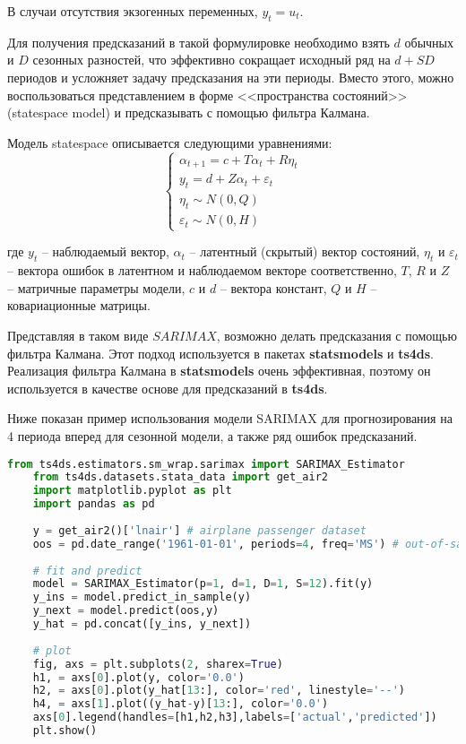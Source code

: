 \documentclass[a4paper,14pt]{extreport}
\begin{document}
	В случаи отсутствия экзогенных переменных, $y_t = u_t$.
	
	Для получения предсказаний в такой формулировке необходимо взять $d$ обычных и $D$ сезонных разностей, что эффективно сокращает исходный ряд на $d+SD$ периодов и усложняет задачу предсказания на эти периоды. Вместо этого, можно воспользоваться представлением в форме <<пространства состояний>> (statespace model) и предсказывать с помощью фильтра Калмана.
	
	Модель statespace описывается следующими уравнениями:
	\begin{equation}
	\begin{cases}
	\alpha_{t+1} = c + T \alpha_t + R \eta_t \\
	y_t = d + Z \alpha_t + \varepsilon_t \\
	\eta_{t} \sim N(0, Q) \\
	\varepsilon_t \sim N(0, H)
	\end{cases} 
	\end{equation}
	
	где $y_t$ – наблюдаемый вектор, $\alpha_t$ – латентный (скрытый) вектор состояний, $\eta_t$ и $\varepsilon_t$ – вектора ошибок в латентном и наблюдаемом векторе соответственно,
	$T$, $R$ и $Z$ – матричные параметры модели, $c$ и $d$ – вектора констант, $Q$ и $H$ – ковариационные матрицы.
	
	Представляя в таком виде $SARIMAX$, возможно делать предсказания с помощью фильтра Калмана. Этот подход используется в пакетах \textbf{statsmodels}\cite{fulton_statespace} и \textbf{ts4ds}. Реализация фильтра Калмана в \textbf{statsmodels} очень эффективная, поэтому он используется в качестве основе для предсказаний в \textbf{ts4ds}. 
	
	Ниже показан пример использования модели SARIMAX для прогнозирования на 4 периода вперед для сезонной модели, а также ряд ошибок предсказаний.
	
	\begin{lstlisting}[language=Python]
	from ts4ds.estimators.sm_wrap.sarimax import SARIMAX_Estimator
	from ts4ds.datasets.stata_data import get_air2
	import matplotlib.pyplot as plt
	import pandas as pd
	
	y = get_air2()['lnair'] # airplane passenger dataset
	oos = pd.date_range('1961-01-01', periods=4, freq='MS') # out-of-sample
	
	# fit and predict
	model = SARIMAX_Estimator(p=1, d=1, D=1, S=12).fit(y)
	y_ins = model.predict_in_sample(y)
	y_next = model.predict(oos,y)
	y_hat = pd.concat([y_ins, y_next])
	
	# plot
	fig, axs = plt.subplots(2, sharex=True)
	h1, = axs[0].plot(y, color='0.0')
	h2, = axs[0].plot(y_hat[13:], color='red', linestyle='--')
	h4, = axs[1].plot((y_hat-y)[13:], color='0.0')
	axs[0].legend(handles=[h1,h2,h3],labels=['actual','predicted'])
	plt.show()
	\end{lstlisting}
	
\end{document}
